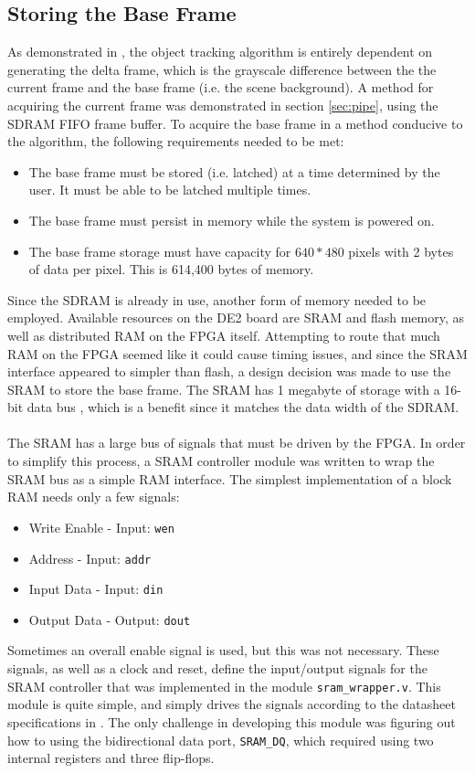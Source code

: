 \documentclass[11pt]{article} %
\begin{document}
\subsection{Storing the Base Frame}
As demonstrated in \cite{phase1}, the object tracking algorithm is entirely dependent on generating the delta frame, which is the grayscale difference between the the current frame and the base frame (i.e. the scene background). A method for acquiring the current frame was demonstrated in section \ref{sec:pipe}, using the SDRAM FIFO frame buffer. To acquire the base frame in a method conducive to the algorithm, the following requirements needed to be met:
\begin{itemize}
\item The base frame must be stored (i.e. latched) at a time determined by the user. It must be able to be latched multiple times.
\item The base frame must persist in memory while the system is powered on.
\item The base frame storage must have capacity for $640*480$ pixels with 2 bytes of data per pixel. This is 614,400 bytes of memory.
\end{itemize}
Since the SDRAM is already in use, another form of memory needed to be employed. Available resources on the DE2 board are SRAM and flash memory, as well as distributed RAM on the FPGA itself. Attempting to route that much RAM on the FPGA seemed like it could cause timing issues, and since the SRAM interface appeared to simpler than flash, a design decision was made to use the SRAM to store the base frame. The SRAM has 1 megabyte of storage with a 16-bit data bus \cite{sram}, which is a benefit since it matches the data width of the SDRAM. \\\\
The SRAM has a large bus of signals that must be driven by the FPGA. In order to simplify this process, a SRAM controller module was written to wrap the SRAM bus as a simple RAM interface. The simplest implementation of a block RAM needs only a few signals:
\begin{itemize}
\item Write Enable - Input: \texttt{wen}
\item Address - Input: \texttt{addr}
\item Input Data - Input: \texttt{din}
\item Output Data - Output: \texttt{dout}
\end{itemize}
Sometimes an overall enable signal is used, but this was not necessary. These signals, as well as a clock and reset, define the input/output signals for the SRAM controller that was implemented in the module \texttt{sram\_wrapper.v}. This module is quite simple, and simply drives the signals according to the datasheet specifications in \cite{sram}. The only challenge in developing this module was figuring out how to using the bidirectional data port, \texttt{SRAM\_DQ}, which required using two internal registers and three flip-flops.
\end{document}
